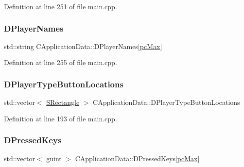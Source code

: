 Definition at line 251 of file main.\+cpp.

\hypertarget{classCApplicationData_a446d88c378b95b1a4f88071612229086}{}\label{classCApplicationData_a446d88c378b95b1a4f88071612229086} 
\subsubsection{\texorpdfstring{D\+Player\+Names}{DPlayerNames}}
{\footnotesize\ttfamily std\+::string C\+Application\+Data\+::\+D\+Player\+Names\mbox{[}\hyperlink{GameDataTypes_8h_aafb0ca75933357ff28a6d7efbdd7602fa594a5c8dd3987f24e8a0f23f1a72cd34}{pc\+Max}\mbox{]}\hspace{0.3cm}{\ttfamily [protected]}}



Definition at line 255 of file main.\+cpp.

\hypertarget{classCApplicationData_a49d2ad6ab469e18577716ac993b475cb}{}\label{classCApplicationData_a49d2ad6ab469e18577716ac993b475cb} 
\subsubsection{\texorpdfstring{D\+Player\+Type\+Button\+Locations}{DPlayerTypeButtonLocations}}
{\footnotesize\ttfamily std\+::vector$<$ \hyperlink{structSRectangle}{S\+Rectangle} $>$ C\+Application\+Data\+::\+D\+Player\+Type\+Button\+Locations\hspace{0.3cm}{\ttfamily [protected]}}



Definition at line 193 of file main.\+cpp.

\hypertarget{classCApplicationData_ac6f50c764f7561c0bd2a9fbce55b2701}{}\label{classCApplicationData_ac6f50c764f7561c0bd2a9fbce55b2701} 
\subsubsection{\texorpdfstring{D\+Pressed\+Keys}{DPressedKeys}}
{\footnotesize\ttfamily std\+::vector$<$ guint $>$ C\+Application\+Data\+::\+D\+Pressed\+Keys\mbox{[}\hyperlink{GameDataTypes_8h_aafb0ca75933357ff28a6d7efbdd7602fa594a5c8dd3987f24e8a0f23f1a72cd34}{pc\+Max}\mbox{]}\hspace{0.3cm}{\ttfamily [protected]}}



